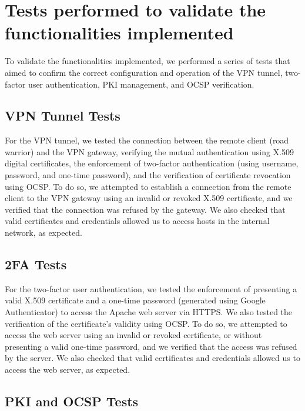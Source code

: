 \documentclass[12pt]{article}
\begin{document}
\section{Tests performed to validate the functionalities implemented}

To validate the functionalities implemented, we performed a series of tests that aimed to confirm the correct configuration and operation of the VPN tunnel, two-factor user authentication, PKI management, and OCSP verification.

\subsection{VPN Tunnel Tests}

For the VPN tunnel, we tested the connection between the remote client (road warrior) and the VPN gateway, verifying the mutual authentication using X.509 digital certificates, the enforcement of two-factor authentication (using username, password, and one-time password), and the verification of certificate revocation using OCSP. To do so, we attempted to establish a connection from the remote client to the VPN gateway using an invalid or revoked X.509 certificate, and we verified that the connection was refused by the gateway. We also checked that valid certificates and credentials allowed us to access hosts in the internal network, as expected.

\newpage

\subsection{2FA Tests}

For the two-factor user authentication, we tested the enforcement of presenting a valid X.509 certificate and a one-time password (generated using Google Authenticator) to access the Apache web server via HTTPS. We also tested the verification of the certificate's validity using OCSP. To do so, we attempted to access the web server using an invalid or revoked certificate, or without presenting a valid one-time password, and we verified that the access was refused by the server. We also checked that valid certificates and credentials allowed us to access the web server, as expected.



\subsection{PKI and OCSP Tests}
\end{document}

